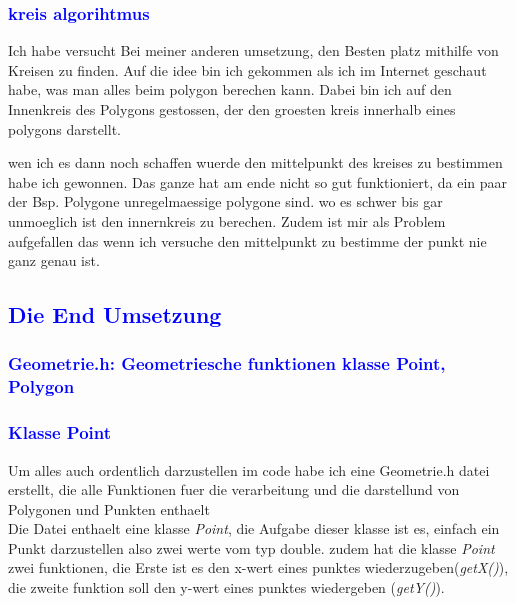 \documentclass{article}
\begin{document}
\subsubsection{\textcolor{blue}{kreis algorihtmus}}
\begin{center}
Ich habe versucht Bei meiner anderen umsetzung, den Besten platz mithilfe von Kreisen zu finden. Auf die idee bin ich gekommen als ich im Internet geschaut habe, was man alles beim polygon berechen kann. Dabei bin ich auf den Innenkreis des Polygons gestossen, der den groesten kreis innerhalb eines polygons darstellt.
\par\medskip
 wen ich es dann noch schaffen wuerde den mittelpunkt des kreises zu bestimmen habe ich gewonnen. Das ganze hat am ende nicht so gut funktioniert, da ein paar der Bsp. Polygone unregelmaessige polygone sind. wo es schwer bis gar unmoeglich ist den innernkreis zu berechen. Zudem ist mir als Problem aufgefallen das wenn ich versuche den mittelpunkt zu bestimme der punkt nie ganz genau ist.
\end{center}
\subsection{\textcolor{blue}{Die End Umsetzung}}
\subsubsection{\textcolor{blue}{Geometrie.h: Geometriesche funktionen klasse Point, Polygon}}
\subsubsection{\textcolor{blue}{Klasse Point}}
\begin{center}
Um alles auch ordentlich darzustellen im code habe ich eine Geometrie.h datei erstellt, die alle Funktionen fuer die verarbeitung und die darstellund von Polygonen und Punkten enthaelt
\\
Die Datei enthaelt eine klasse \textit{Point}, die Aufgabe dieser klasse ist es, einfach ein Punkt darzustellen also zwei werte vom typ double. zudem hat die klasse \textit{Point} zwei funktionen, die Erste ist es den x-wert eines punktes wiederzugeben(\textit{getX()}), die zweite funktion soll den y-wert eines punktes wiedergeben (\textit{getY()}).  
\end{center}
\end{document}
